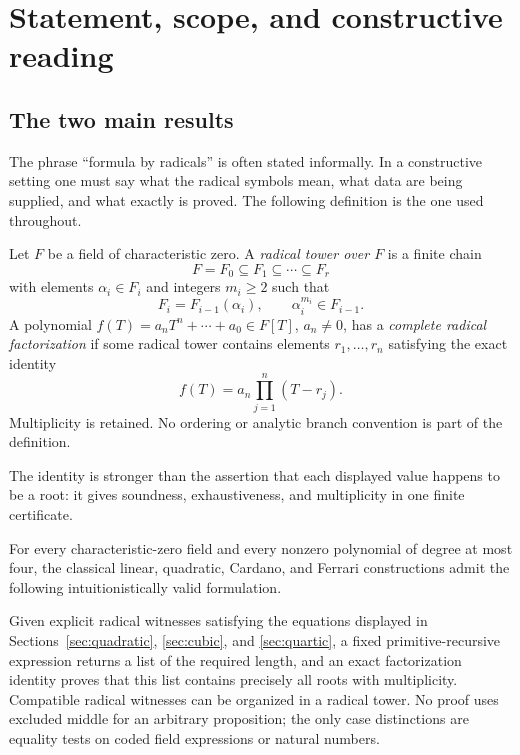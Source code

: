 \section{Statement, scope, and constructive reading}

\subsection{The two main results}

The phrase ``formula by radicals'' is often stated informally.  In a
constructive setting one must say what the radical symbols mean, what data are
being supplied, and what exactly is proved.  The following definition is the
one used throughout.

\begin{definition}
Let $F$ be a field of characteristic zero.  A \emph{radical tower over $F$}
is a finite chain
\[
 F=F_0\subseteq F_1\subseteq\cdots\subseteq F_r
\]
with elements $\alpha_i\in F_i$ and integers $m_i\ge 2$ such that
\[
 F_i=F_{i-1}(\alpha_i),\qquad \alpha_i^{m_i}\in F_{i-1}.
\]
A polynomial $f(T)=a_nT^n+\cdots+a_0\in F[T]$, $a_n\ne0$, has a
\emph{complete radical factorization} if some radical tower contains elements
$r_1,\ldots,r_n$ satisfying the exact identity
\[
 f(T)=a_n\prod_{j=1}^{n}(T-r_j).
\]
Multiplicity is retained.  No ordering or analytic branch convention is part
of the definition.
\end{definition}

The identity is stronger than the assertion that each displayed value happens
to be a root: it gives soundness, exhaustiveness, and multiplicity in one
finite certificate.

\begin{theorem}
\label{thm:low-degree-main}
For every characteristic-zero field and every nonzero polynomial of degree at
most four, the classical linear, quadratic, Cardano, and Ferrari constructions
admit the following intuitionistically valid formulation.

Given explicit radical witnesses satisfying the equations displayed in
Sections~\ref{sec:quadratic}, \ref{sec:cubic}, and \ref{sec:quartic}, a fixed
primitive-recursive expression returns a list of the required length, and an
exact factorization identity proves that this list contains precisely all
roots with multiplicity.  Compatible radical witnesses can be organized in a
radical tower.  No proof uses excluded middle for an arbitrary proposition;
the only case distinctions are equality tests on coded field expressions or
natural numbers.
\end{theorem}

